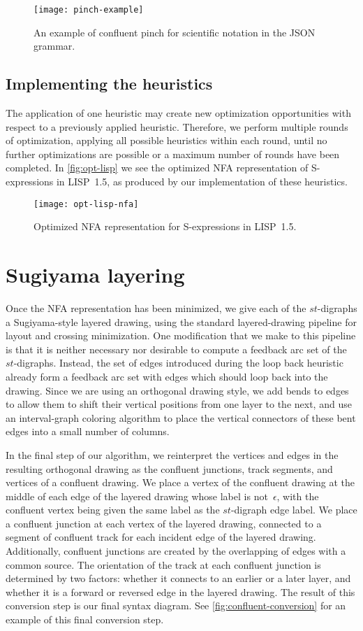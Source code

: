 \documentclass[10pt]{llncs}
\begin{document}
\begin{figure}
\centering
\texttt{[image: pinch-example]}
\caption{An example of confluent pinch for scientific notation in the JSON grammar.}
\label{fig:confluent-pinch}
\end{figure}

\subsection{Implementing the heuristics}
The application of one heuristic may create new optimization opportunities with respect to a previously applied heuristic. Therefore, we perform multiple rounds of optimization, applying all possible heuristics within each round, until no further optimizations are possible or a maximum number of rounds have been completed. In \autoref{fig:opt-lisp} we see the optimized NFA representation of S-expressions in LISP~1.5, as produced by our implementation of these heuristics.

\begin{figure}
\centering
\texttt{[image: opt-lisp-nfa]}
\caption{Optimized NFA representation for S-expressions in LISP~1.5.}
\label{fig:opt-lisp}
\end{figure}

\section{Sugiyama layering}
Once the NFA representation has been minimized, we give each of the $st$-digraphs a Sugiyama-style layered drawing, using the standard layered-drawing pipeline for layout and crossing minimization. One modification that we make to this pipeline is that it is neither necessary nor desirable to compute a feedback arc set of the $st$-digraphs. Instead, the set of edges introduced during the loop back heuristic already form a feedback arc set with edges which should loop back into the drawing. Since we are using an orthogonal drawing style, we add bends to edges to allow them to shift their vertical positions from one layer to the next, and use an interval-graph coloring algorithm to place the vertical connectors of these bent edges into a small number of columns.

In the final step of our algorithm, we reinterpret the vertices and edges in the resulting orthogonal drawing as the confluent junctions, track segments, and vertices of a confluent drawing. We place a vertex of the confluent drawing at the middle of each edge of the layered drawing whose label is not~$\epsilon$, with the confluent vertex being given the same label as the $st$-digraph edge label.
We place a confluent junction at each vertex of the layered drawing, connected to a segment of confluent track for each incident edge of the layered drawing. Additionally, confluent junctions are created by the overlapping of edges with a common source. The orientation of the track at each confluent junction is determined by two factors: whether it connects to an earlier or a later layer, and whether it is a forward or reversed edge in the layered drawing. The result of this conversion step is our final syntax diagram. See \autoref{fig:confluent-conversion} for an example of this final conversion step.
\end{document}
